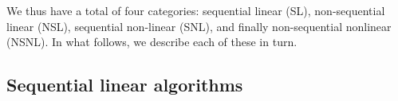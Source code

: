  We thus have a total of four categories: sequential linear (SL),
 non-sequential linear (NSL), sequential non-linear (SNL), and finally
 non-sequential nonlinear (NSNL). In what follows, we describe each of these in turn.


\subsection{Sequential linear algorithms}
\label{subsec:seq-lin}

